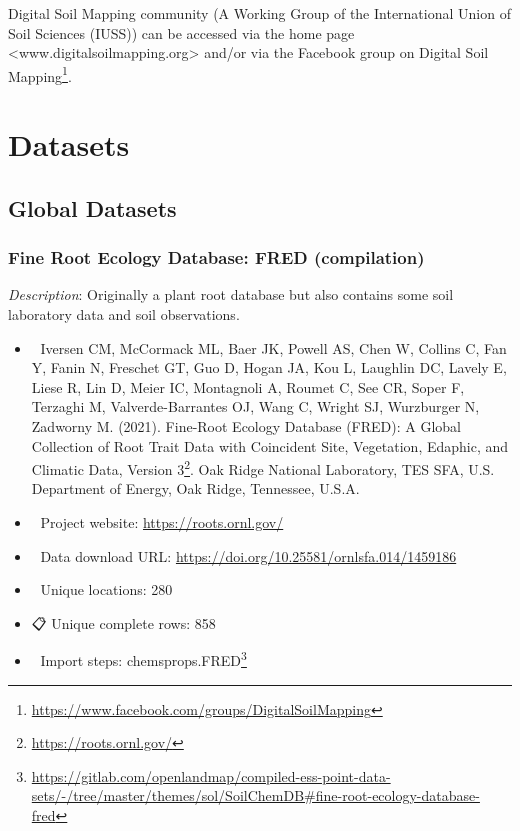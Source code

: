 \documentclass[
  graybox,natbib,nospthms]{svmono}
\providecommand{\tightlist}{%
  \setlength{\itemsep}{0pt}\setlength{\parskip}{0pt}}
\providecommand{\tightlist}{\setlength{\itemsep}{0pt}\setlength{\parskip}{0pt}}
\renewcommand{\href}[2]{#2 (\url{#1})}
\renewcommand{\href}[2]{#2\footnote{\url{#1}}}
\begin{document}
Digital Soil Mapping community (A Working Group of the International Union of Soil Sciences (IUSS))
can be accessed via the home page \textless www.digitalsoilmapping.org\textgreater{} and/or
via the Facebook group on \href{https://www.facebook.com/groups/DigitalSoilMapping}{Digital Soil Mapping}.

\hypertarget{datasets}{%
\chapter{Datasets}\label{datasets}}

\hypertarget{global-datasets}{%
\section{Global Datasets}\label{global-datasets}}

\hypertarget{fine-root-ecology-database-fred-compilation}{%
\subsection{Fine Root Ecology Database: FRED (compilation)}\label{fine-root-ecology-database-fred-compilation}}

\emph{Description}: Originally a plant root database but also contains some soil laboratory data
and soil observations.

\begin{itemize}
\tightlist
\item
  📕 Iversen CM, McCormack ML, Baer JK, Powell AS, Chen W, Collins C, Fan Y, Fanin N, Freschet GT, Guo D, Hogan JA, Kou L, Laughlin DC, Lavely E, Liese R, Lin D, Meier IC, Montagnoli A, Roumet C, See CR, Soper F, Terzaghi M, Valverde-Barrantes OJ, Wang C, Wright SJ, Wurzburger N, Zadworny M. (2021). \href{https://roots.ornl.gov/}{Fine-Root Ecology Database (FRED): A Global Collection of Root Trait Data with Coincident Site, Vegetation, Edaphic, and Climatic Data, Version 3}. Oak Ridge National Laboratory, TES SFA, U.S. Department of Energy, Oak Ridge, Tennessee, U.S.A.\\
\item
  🔗 Project website: \url{https://roots.ornl.gov/}\\
\item
  📂 Data download URL: \url{https://doi.org/10.25581/ornlsfa.014/1459186}\\
\item
  📍 Unique locations: 280\\
\item
  📋 Unique complete rows: 858\\
\item
  📝 Import steps: \href{https://gitlab.com/openlandmap/compiled-ess-point-data-sets/-/tree/master/themes/sol/SoilChemDB\#fine-root-ecology-database-fred}{chemsprops.FRED}
\end{itemize}
\end{document}
